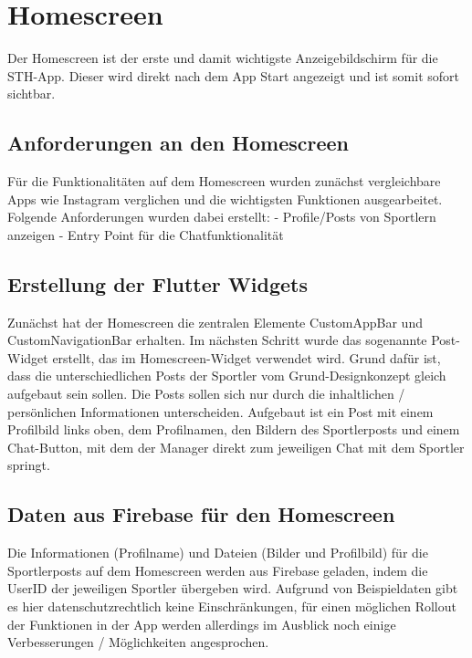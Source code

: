 \chapter{Homescreen}
Der Homescreen ist der erste und damit wichtigste Anzeigebildschirm für die STH-App. 
Dieser wird direkt nach dem App Start angezeigt und ist somit sofort sichtbar.
\section*{Anforderungen an den Homescreen}
Für die Funktionalitäten auf dem Homescreen wurden zunächst vergleichbare Apps wie Instagram verglichen und die wichtigsten Funktionen ausgearbeitet.\newline
Folgende Anforderungen wurden dabei erstellt:\newline
- Profile/Posts von Sportlern anzeigen\newline
- Entry Point für die Chatfunktionalität

\section*{Erstellung der Flutter Widgets}
Zunächst hat der Homescreen die zentralen Elemente CustomAppBar und CustomNavigationBar erhalten.
Im nächsten Schritt wurde das sogenannte Post-Widget erstellt, das im Homescreen-Widget verwendet wird.
Grund dafür ist, dass die unterschiedlichen Posts der Sportler vom Grund-Designkonzept gleich aufgebaut sein sollen. 
Die Posts sollen sich nur durch die inhaltlichen / persönlichen Informationen unterscheiden.\newline
Aufgebaut ist ein Post mit einem Profilbild links oben, dem Profilnamen, den Bildern des Sportlerposts und einem Chat-Button, mit dem der Manager direkt zum jeweiligen Chat mit dem Sportler springt.

\section*{Daten aus Firebase für den Homescreen}
Die Informationen (Profilname) und Dateien (Bilder und Profilbild) für die Sportlerposts auf dem Homescreen werden aus Firebase geladen, indem die UserID der jeweiligen Sportler übergeben wird.
Aufgrund von Beispieldaten gibt es hier datenschutzrechtlich keine Einschränkungen, für einen möglichen Rollout der Funktionen in der App werden allerdings im Ausblick noch einige Verbesserungen / Möglichkeiten angesprochen.

